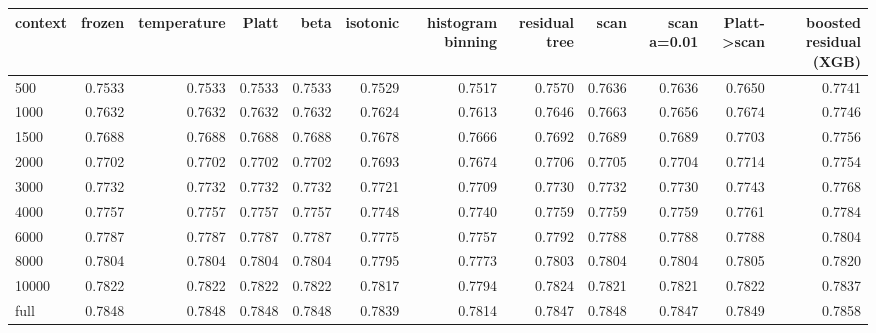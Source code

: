 \begin{tabular}{lrrrrrrrrrrr}
\toprule
context & frozen & temperature & Platt & beta & isotonic & histogram binning & residual tree & scan & scan a=0.01 & Platt->scan & boosted residual (XGB) \\
\midrule
500 & 0.7533 & 0.7533 & 0.7533 & 0.7533 & 0.7529 & 0.7517 & 0.7570 & 0.7636 & 0.7636 & 0.7650 & 0.7741 \\
1000 & 0.7632 & 0.7632 & 0.7632 & 0.7632 & 0.7624 & 0.7613 & 0.7646 & 0.7663 & 0.7656 & 0.7674 & 0.7746 \\
1500 & 0.7688 & 0.7688 & 0.7688 & 0.7688 & 0.7678 & 0.7666 & 0.7692 & 0.7689 & 0.7689 & 0.7703 & 0.7756 \\
2000 & 0.7702 & 0.7702 & 0.7702 & 0.7702 & 0.7693 & 0.7674 & 0.7706 & 0.7705 & 0.7704 & 0.7714 & 0.7754 \\
3000 & 0.7732 & 0.7732 & 0.7732 & 0.7732 & 0.7721 & 0.7709 & 0.7730 & 0.7732 & 0.7730 & 0.7743 & 0.7768 \\
4000 & 0.7757 & 0.7757 & 0.7757 & 0.7757 & 0.7748 & 0.7740 & 0.7759 & 0.7759 & 0.7759 & 0.7761 & 0.7784 \\
6000 & 0.7787 & 0.7787 & 0.7787 & 0.7787 & 0.7775 & 0.7757 & 0.7792 & 0.7788 & 0.7788 & 0.7788 & 0.7804 \\
8000 & 0.7804 & 0.7804 & 0.7804 & 0.7804 & 0.7795 & 0.7773 & 0.7803 & 0.7804 & 0.7804 & 0.7805 & 0.7820 \\
10000 & 0.7822 & 0.7822 & 0.7822 & 0.7822 & 0.7817 & 0.7794 & 0.7824 & 0.7821 & 0.7821 & 0.7822 & 0.7837 \\
full & 0.7848 & 0.7848 & 0.7848 & 0.7848 & 0.7839 & 0.7814 & 0.7847 & 0.7848 & 0.7847 & 0.7849 & 0.7858 \\
\bottomrule
\end{tabular}
